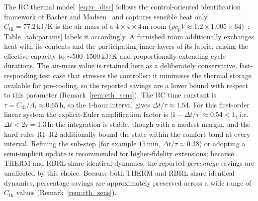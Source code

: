 \documentclass[3p,number]{elsarticle}
\newcommand{\Cth}{C_{\mathrm{th}}}
\begin{document}
\begin{remark}
\label{rem:rc}
The RC thermal model~\eqref{eq:rc_disc} follows the control-oriented
identification framework of Bacher and Madsen~\cite{Bacher2011} and
captures sensible heat only.
$\Cth=77.2\,\text{kJ/K}$ is the air mass of a
$4\times4\times4\,\text{m}$ room
($\rho c_p V{\approx}1.2{\times}1.005{\times}64$)~\cite{Zamani2024};
Table~\ref{tab:params} labels it accordingly. A furnished room additionally
exchanges heat with its contents and the participating inner layers of its
fabric, raising the effective capacity to ${\sim}500$--$1500\,\text{kJ/K}$ and
proportionally extending cycle durations. The air-mass value is retained here as
a deliberately conservative, fast-responding test case that stresses the
controller: it minimises the thermal storage available for pre-cooling, so the
reported savings are a lower bound with respect to this parameter
(Remark~\ref{rem:cth_sens}).
The RC time constant is $\tau=\Cth/\Lambda_i\approx0.65\,\text{h}$, so the $1$-hour interval gives $\Delta t/\tau\approx1.54$. For this first-order linear system the explicit-Euler amplification factor is $|1-\Delta t/\tau|\approx0.54<1$, i.e.\ $\Delta t<2\tau=1.3\,\text{h}$: the integration is stable, though with a modest margin, and the hard rules R1--R2 additionally bound the state within the comfort band at every interval. Refining the sub-step (for example $15\,\text{min}$, $\Delta t/\tau\approx0.38$) or adopting a semi-implicit update is recommended for higher-fidelity extensions; because THERM and RBRL share identical dynamics, the reported \emph{percentage} savings are unaffected by this choice.
Because both THERM and RBRL share identical dynamics, percentage savings
are approximately preserved across a wide range of $\Cth$ values
(Remark~\ref{rem:cth_sens}).
\end{remark}
 
\end{document}
